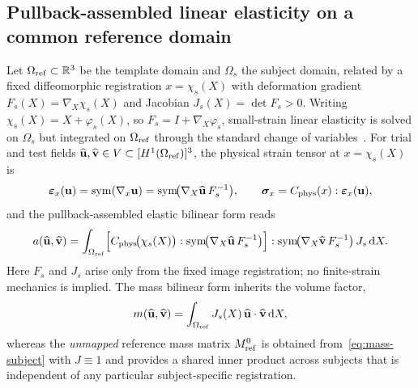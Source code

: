 \documentclass[11pt]{article}
\begin{document}
\subsection{Pullback-assembled linear elasticity on a common reference domain}
\label{sec:pullback}

Let $\Omega_{\rm ref}\subset\mathbb R^3$ be the template domain and $\Omega_s$ the subject domain, related by a fixed diffeomorphic registration $x=\chi_s(X)$ with deformation gradient $F_s(X)=\nabla_X\chi_s(X)$ and Jacobian $J_s(X)=\det F_s>0$.
Writing $\chi_s(X)=X+\varphi_s(X)$, so $F_s=I+\nabla_X\varphi_s$, small-strain linear elasticity is solved on $\Omega_s$ but integrated on $\Omega_{\rm ref}$ through the standard change of variables~\citep{MarsdenHughes1983,BonetWood1997}.
For trial and test fields $\widehat{\mathbf u},\widehat{\mathbf v}\in V\subset[H^1(\Omega_{\rm ref})]^3$, the physical strain tensor at $x=\chi_s(X)$ is
\begin{equation}
\bm\varepsilon_x(\mathbf u)=\mathrm{sym}(\nabla_x \mathbf u)=\mathrm{sym}\!\big(\nabla_X \widehat{\mathbf u}\,F_s^{-1}\big),
\qquad
\bm\sigma_x=C_{\rm phys}(x):\bm\varepsilon_x(\mathbf u),
\end{equation}
and the pullback-assembled elastic bilinear form reads
\begin{equation}
a(\widehat{\mathbf u},\widehat{\mathbf v})
=\int_{\Omega_{\rm ref}}\!\Big[C_{\rm phys}\!\big(\chi_s(X)\big):\mathrm{sym}\!\big(\nabla_X \widehat{\mathbf u}\,F_s^{-1}\big)\Big]
:\mathrm{sym}\!\big(\nabla_X \widehat{\mathbf v}\,F_s^{-1}\big)\,J_s\,\mathrm dX.
\label{eq:pullback-bilinear}
\end{equation}
Here $F_s$ and $J_s$ arise only from the fixed image registration; no finite-strain mechanics is implied.
The mass bilinear form inherits the volume factor,
\begin{equation}
m(\widehat{\mathbf u},\widehat{\mathbf v})
=\int_{\Omega_{\rm ref}} J_s(X)\,\widehat{\mathbf u}\cdot\widehat{\mathbf v}\,\mathrm dX,
\label{eq:mass-subject}
\end{equation}
whereas the \emph{unmapped} reference mass matrix $M_{\rm ref}^{0}$ is obtained from~\eqref{eq:mass-subject} with $J\equiv 1$ and provides a shared inner product across subjects that is independent of any particular subject-specific registration.
\end{document}
